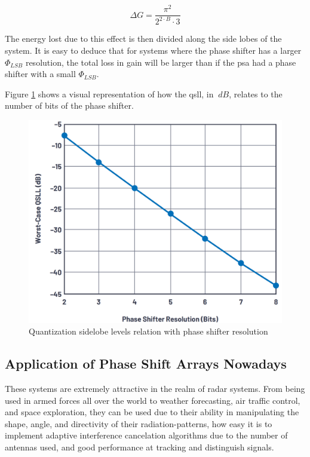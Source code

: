 \begin{equation}
    \label{ch2_GainLossLSB}
    \Delta G = \frac{\pi^{2}}{2^{2\cdot B}\cdot 3}
\end{equation}

\par The energy lost due to this effect is then divided along the side lobes of the system. It is easy to deduce that for systems where the phase shifter has a larger $\Phi_{LSB}$ resolution, the total loss in gain will be larger than if the \ac{psa} had a phase shifter with a small $\Phi_{LSB}$.

\par Figure \ref{fig:ch_2_secArray_QSLL.png} shows a visual representation of how the \ac{qsll}, in $\:\si{dB}$, relates to the number of bits of the phase shifter. 

\begin{figure}[H]
    \vspace*{0cm}
    \centering
    \includegraphics[width=0.5\linewidth]{figs/ch_2_secArray_QSLL.png}
    \caption{Quantization sidelobe levels relation with phase shifter resolution\cite{Delos2020PhasedDevicesc}}
    \label{fig:ch_2_secArray_QSLL.png}
\end{figure}

\subsection{Application of Phase Shift Arrays Nowadays}
\par These systems are extremely attractive in the realm of radar systems. From being used in armed forces all over the world to weather forecasting, air traffic control, and space exploration, they can be used due to their ability in manipulating the shape, angle, and directivity of their radiation-patterns, how easy it is to implement adaptive interference cancelation algorithms due to the number of antennas used, and good performance at tracking and distinguish signals.

